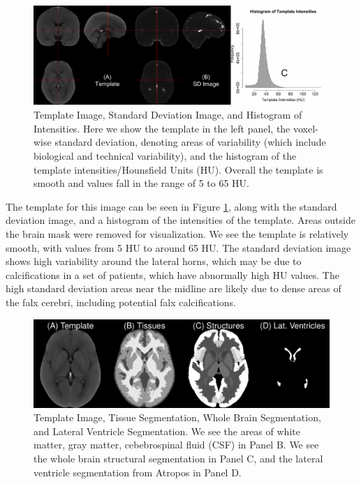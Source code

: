 \documentclass[]{elsarticle} %
\makeatletter
\def\maxwidth{\ifdim\Gin@nat@width>\linewidth\linewidth
\else\Gin@nat@width\fi}
\let\Oldincludegraphics\includegraphics
\renewcommand{\includegraphics}[1]{\Oldincludegraphics[width=\maxwidth]{#1}}
\makeatother
\begin{document}
\begin{figure}
\centering
\includegraphics{index_files/figure-latex/template-1.pdf}
\caption{\label{fig:template}Template Image, Standard Deviation Image, and Histogram of Intensities. Here we show the template in the left panel, the voxel-wise standard deviation, denoting areas of variability (which include biological and technical variability), and the histogram of the template intensities/Hounsfield Units (HU). Overall the template is smooth and values fall in the range of 5 to 65 HU.}
\end{figure}

The template for this image can be seen in Figure \ref{fig:template}, along with the standard deviation image, and a histogram of the intensities of the template. Areas outside the brain mask were removed for visualization. We see the template is relatively smooth, with values from 5 HU to around 65 HU. The standard deviation image shows high variability around the lateral horns, which may be due to calcifications in a set of patients, which have abnormally high HU values. The high standard deviation areas near the midline are likely due to dense areas of the falx cerebri, including potential falx calcifications.

\begin{figure}
\centering
\includegraphics{index_files/figure-latex/all_segs.pdf}
\caption{\label{fig:seg}Template Image, Tissue Segmentation, Whole Brain Segmentation, and Lateral Ventricle Segmentation. We see the areas of white matter, gray matter, cebebrospinal fluid (CSF) in Panel B. We see the whole brain structural segmentation in Panel C, and the lateral ventricle segmentation from Atropos in Panel D.}
\end{figure}
\end{document}
